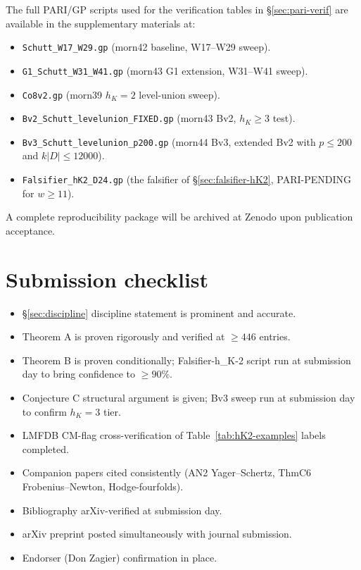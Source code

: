 \documentclass[11pt,a4paper]{amsart}
\theoremstyle{definition}
\newcommand{\hK}{h_{K}}
\begin{document}
The full PARI/GP scripts used for the verification tables in \S\ref{sec:pari-verif} are available in the supplementary materials at:
\begin{itemize}[leftmargin=2em]
  \item \texttt{Schutt\_W17\_W29.gp} (morn42 baseline, W17--W29 sweep).
  \item \texttt{G1\_Schutt\_W31\_W41.gp} (morn43 G1 extension, W31--W41 sweep).
  \item \texttt{Co8v2.gp} (morn39 $\hK = 2$ level-union sweep).
  \item \texttt{Bv2\_Schutt\_levelunion\_FIXED.gp} (morn43 Bv2, $\hK \ge 3$ test).
  \item \texttt{Bv3\_Schutt\_levelunion\_p200.gp} (morn44 Bv3, extended Bv2 with $p \le 200$ and $k|D| \le 12000$).
  \item \texttt{Falsifier\_hK2\_D24.gp} (the falsifier of \S\ref{sec:falsifier-hK2}, PARI-PENDING for $w \ge 11$).
\end{itemize}

A complete reproducibility package will be archived at Zenodo upon publication acceptance.


\section{Submission checklist}\label{app:checklist}

\begin{itemize}[leftmargin=2em]
  \item[$\square$] \S\ref{sec:discipline} discipline statement is prominent and accurate.
  \item[$\square$] Theorem A is proven rigorously and verified at $\ge 446$ entries.
  \item[$\square$] Theorem B is proven conditionally; Falsifier-h\_K-2 script run at submission day to bring confidence to $\ge 90\%$.
  \item[$\square$] Conjecture C structural argument is given; Bv3 sweep run at submission day to confirm $\hK = 3$ tier.
  \item[$\square$] LMFDB CM-flag cross-verification of Table~\ref{tab:hK2-examples} labels completed.
  \item[$\square$] Companion papers cited consistently (AN2 Yager--Schertz, ThmC6 Frobenius--Newton, Hodge-fourfolds).
  \item[$\square$] Bibliography arXiv-verified at submission day.
  \item[$\square$] arXiv preprint posted simultaneously with journal submission.
  \item[$\square$] Endorser (Don Zagier) confirmation in place.
\end{itemize}
\end{document}
